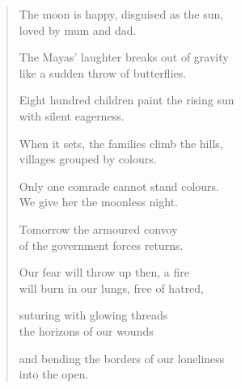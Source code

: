 \vspace*{-1em}
\begin{verse}

The moon is happy, disguised as the sun,\\
loved by mum and dad.

The Mayas' laughter breaks out of gravity\\
like a sudden throw of butterflies.

Eight hundred children paint the rising sun\\
with silent eagerness.

When it sets, the families climb the hills,\\
villages grouped by colours.

Only one comrade cannot stand colours.\\
We give her the moonless night.

Tomorrow the armoured convoy\\
of the government forces returns.

Our fear will throw up then, a fire\\
will burn in our lungs, free of hatred,

suturing with glowing threads\\
the horizons of our wounds

and bending the borders of our loneliness\\
into the open.

\end{verse}

